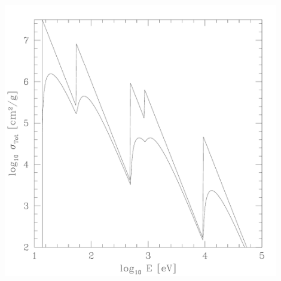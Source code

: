 \documentclass{article}
\begin{document}
\begin{enumerate}
{
\centering
\includegraphics[width=0.9\textwidth]{week9cross} }
\end{enumerate}

\ifx\bookloaded\undefined
\end{document}
